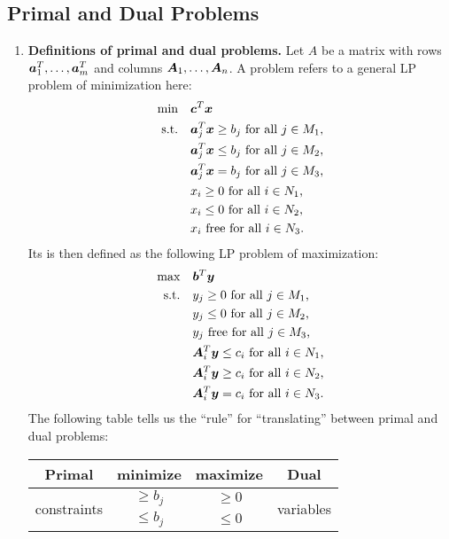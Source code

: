 \subsection{Primal and Dual Problems}
\begin{enumerate}
\item \textbf{Definitions of primal and dual problems.} Let \(A\) be a matrix
with rows \(\bm{a}_1^{T},\dotsc,\bm{a}_m^{T}\) and columns
\(\bm{A}_1,\dotsc,\bm{A}_n\).
A  problem
refers to a general LP problem of minimization here:
\begin{align*}
\text{min}\quad&\bm{c}^{T}\bm{x} \\
\text{s.t.}\quad&\bm{a}_j^{T}\bm{x}\ge b_j \text{ for all \(j\in M_1\),} \\
\quad&\bm{a}_j^{T}\bm{x}\le b_j \text{ for all \(j\in M_2\),} \\
\quad&\bm{a}_j^{T}\bm{x}=b_j \text{ for all \(j\in M_3\),} \\
\quad&x_i\ge 0\text{ for all \(i\in N_1\),} \\
\quad&x_i\le 0\text{ for all \(i\in N_2\),} \\
\quad&x_i\text{ free}\text{ for all \(i\in N_3\).}
\end{align*}
Its  is then defined as the following LP problem of maximization:
\begin{align*}
\text{max}\quad&\bm{b}^{T}\bm{y} \\
\text{s.t.}\quad&y_j\ge 0 \text{ for all \(j\in M_1\),} \\
\quad&y_j\le 0 \text{ for all \(j\in M_2\),} \\
\quad&y_j\text{ free} \text{ for all \(j\in M_3\),} \\
\quad&\bm{A}_i^{T}\bm{y}\le c_i\text{ for all \(i\in N_1\),} \\
\quad&\bm{A}_i^{T}\bm{y}\ge c_i\text{ for all \(i\in N_2\),} \\
\quad&\bm{A}_i^{T}\bm{y}=c_i\text{ for all \(i\in N_3\).}
\end{align*}
The following table tells us the ``rule'' for ``translating'' between primal and
dual problems:
\begin{center}
\begin{tabular}{cccc}
\toprule
Primal&minimize&maximize&Dual \\
\midrule
\multirow{3}{*}{constraints}&\(\ge b_j\)&\(\ge 0\)&\multirow{3}{*}{variables} \\
&\(\le b_j\)&\(\le 0\)& \\

\end{tabular}
\end{center}
\end{enumerate}
